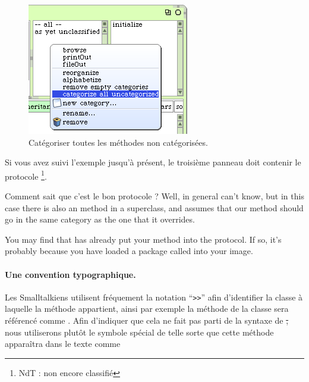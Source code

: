 \documentclass[a4paper,10pt,twoside]{book}
\begin{document}
\begin{figure}[htbp]
   \centering
   \includegraphics[scale=0.7]{Categorize} 
   \caption{Catégoriser toutes les méthodes non catégorisées.\label{fig:categorize}}
\end{figure}

Si vous avez suivi l'exemple jusqu'à présent, le troisième panneau doit contenir le protocole \footnote{NdT : non encore classifié}.

Comment \squeak{} sait que c'est le bon protocole ? Well, in general \squeak{} can't know, but in this case there is also an  method in a superclass, and \squeak assumes that our  method should go in the same category as the one that it overrides.

You may find that \squeak has already put your  method into the  protocol.
If so, it's probably because you have loaded a package called  into your image.

\paragraph{Une convention typographique.} Les Smalltalkiens utilisent fréquement la notation ``\verb|>>|'' afin d'identifier la classe à laquelle la méthode appartient, ainsi par exemple la méthode  de la classe  sera référencé comme .
Afin d'indiquer que cela ne fait pas parti de la syntaxe de \st, nous utiliserons plutôt le symbole spécial \ct{>>>} de telle sorte que cette méthode apparaîtra dans le texte comme 
\end{document}
